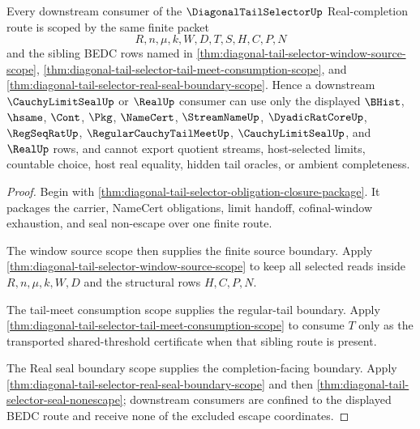 \begin{theorem}
\label{thm:diagonal-tail-selector-downstream-nonescape-scope}
Every downstream consumer of the $\DiagonalTailSelectorUp$ Real-completion
route is scoped by the same finite packet
$$
R,n,\mu,k,W,D,T,S,H,C,P,N
$$
and the sibling BEDC rows named in
\autoref{thm:diagonal-tail-selector-window-source-scope},
\autoref{thm:diagonal-tail-selector-tail-meet-consumption-scope}, and
\autoref{thm:diagonal-tail-selector-real-seal-boundary-scope}. Hence a
downstream $\CauchyLimitSealUp$ or $\RealUp$ consumer can use only the
displayed $\BHist$, $\hsame$, $\Cont$, $\Pkg$, $\NameCert$,
$\StreamNameUp$, $\DyadicRatCoreUp$, $\RegSeqRatUp$,
$\RegularCauchyTailMeetUp$, $\CauchyLimitSealUp$, and $\RealUp$ rows, and
cannot export quotient streams, host-selected limits, countable choice, host
real equality, hidden tail oracles, or ambient completeness.
\end{theorem}
\begin{proof}
Begin with \autoref{thm:diagonal-tail-selector-obligation-closure-package}.
It packages the carrier, NameCert obligations, limit handoff,
cofinal-window exhaustion, and seal non-escape over one finite route.

The window source scope then supplies the finite source boundary. Apply
\autoref{thm:diagonal-tail-selector-window-source-scope} to keep all
selected reads inside $R,n,\mu,k,W,D$ and the structural rows $H,C,P,N$.

The tail-meet consumption scope supplies the regular-tail boundary. Apply
\autoref{thm:diagonal-tail-selector-tail-meet-consumption-scope} to consume
$T$ only as the transported shared-threshold certificate when that sibling
route is present.

The Real seal boundary scope supplies the completion-facing boundary. Apply
\autoref{thm:diagonal-tail-selector-real-seal-boundary-scope} and then
\autoref{thm:diagonal-tail-selector-seal-nonescape}; downstream consumers
are confined to the displayed BEDC route and receive none of the excluded
escape coordinates.
\end{proof}

